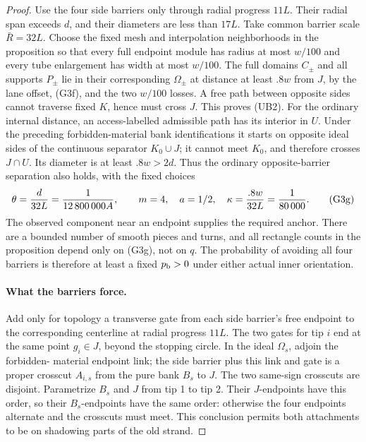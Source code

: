 \begin{proof}
Use the four side barriers only through radial progress \(11L\).
Their radial span exceeds \(d\), and their diameters are less than
\(17L\).  Take common barrier scale \(\bar R=32L\).  Choose the fixed
mesh and interpolation neighborhoods in the proposition so that every
full endpoint module has radius at most \(w/100\) and every tube
enlargement has width at most \(w/100\).  The full domains \(C_\pm\)
and all supports \(P_\pm\) lie in their corresponding \(\Omega_\pm\)
at distance at least \(.8w\) from \(J\), by the lane offset, (G3f), and
the two \(w/100\) losses.  A free path between opposite sides cannot
traverse fixed \(K\), hence must cross \(J\).  This proves (UB2).
For the ordinary internal distance, an access-labelled admissible path
has its interior in \(U\).  Under the preceding forbidden-material bank
identifications it starts on opposite ideal sides of the continuous
separator \(K_0\cup J\); it cannot meet \(K_0\), and therefore crosses
\(J\cap U\).  Its diameter is at least \(.8w>2d\).  Thus the ordinary
opposite-barrier separation also holds, with the fixed choices
\[
 \theta={d\over32L}={1\over12\,800\,000A},\qquad
 m=4,\quad a=1/2,\quad \kappa={.8w\over32L}={1\over80\,000}.   \tag{G3g}
\]
The observed component near an endpoint supplies the required anchor.
There are a bounded number of smooth pieces and turns, and all rectangle
counts in the proposition depend only on (G3g), not on \(q\).  The
probability of avoiding all four barriers is therefore at least a fixed
\(p_{\rm b}>0\) under either actual inner orientation.

\paragraph{What the barriers force.}
Add only for topology a transverse gate from each side barrier's free
endpoint to the corresponding centerline at radial progress \(11L\).
The two gates for tip \(i\) end at the same point \(g_i\in J\), beyond
the stopping circle.  In the ideal \(\Omega_s\), adjoin the forbidden-
material endpoint link; the side barrier plus this link and gate is a proper
crosscut \(A_{i,s}\) from the pure bank \(B_s\) to \(J\).
The two same-sign crosscuts are disjoint.  Parametrize \(B_s\) and \(J\)
from tip 1 to tip 2.  Their \(J\)-endpoints have this order, so their
\(B_s\)-endpoints have the same order: otherwise the four endpoints
alternate and the crosscuts must meet.  This conclusion permits both
attachments to be on shadowing parts of the old strand.


\end{proof}
